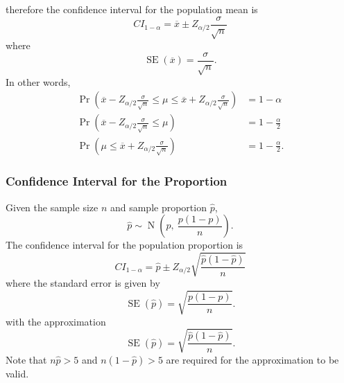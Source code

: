 \documentclass{article}
\begin{document}
therefore the confidence interval for the population mean is
\begin{equation*}
    {CI}_{1-\alpha} = \overline{x} \pm Z_{\alpha/2} \frac{\sigma}{\sqrt{n}}
\end{equation*}
where
\begin{equation*}
    \operatorname{SE}\left( \overline{x} \right) = \frac{\sigma}{\sqrt{n}}.
\end{equation*}
In other words,
\begin{align*}
    \Pr{\left( \overline{x} - Z_{\alpha/2} \frac{\sigma}{\sqrt{n}} \leq \mu \leq \overline{x} + Z_{\alpha/2} \frac{\sigma}{\sqrt{n}} \right)} & = 1 - \alpha            \\
    \Pr{\left( \overline{x} - Z_{\alpha/2} \frac{\sigma}{\sqrt{n}} \leq \mu \right)}                                                          & = 1 - \frac{\alpha}{2}  \\
    \Pr{\left( \mu \leq \overline{x} + Z_{\alpha/2} \frac{\sigma}{\sqrt{n}} \right)}                                                          & = 1 - \frac{\alpha}{2}.
\end{align*}
\subsubsection{Confidence Interval for the Proportion}
Given the sample size \(n\) and sample proportion \(\hat{p}\),
\begin{equation*}
    \hat{p} \sim \operatorname{N}\left( p,\: \frac{p\left( 1 - p \right)}{n} \right).
\end{equation*}
The confidence interval for the population proportion is
\begin{equation*}
    {CI}_{1-\alpha} = \hat{p} \pm Z_{\alpha/2} \sqrt{\frac{\hat{p}\left( 1 - \hat{p} \right)}{n}}
\end{equation*}
where the standard error is given by
\begin{equation*}
    \operatorname{SE}\left( \hat{p} \right) = \sqrt{\frac{p\left( 1 - p \right)}{n}}.
\end{equation*}
with the approximation
\begin{equation*}
    \operatorname{SE}\left( \hat{p} \right) = \sqrt{\frac{\hat{p}\left( 1 - \hat{p} \right)}{n}}.
\end{equation*}
Note that \(n \hat{p} > 5\) and \(n \left( 1 - \hat{p} \right) > 5\) are required for the approximation to be valid.
\end{document}
